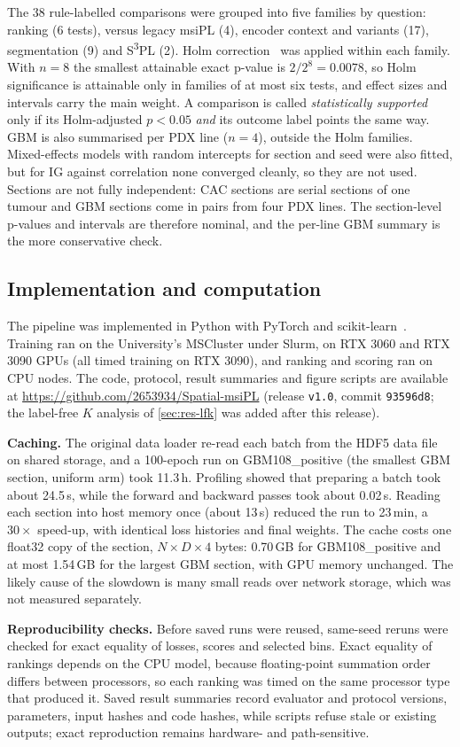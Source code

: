 The 38 rule-labelled comparisons were grouped into five families by question:
ranking (6 tests), versus legacy msiPL (4), encoder context and variants (17),
segmentation (9) and S\textsuperscript{3}PL (2). Holm
correction~\citep{holm1979simple} was applied within each family. With $n=8$
the smallest attainable exact p-value is $2/2^8=0.0078$, so Holm significance
is attainable only in families of at most six tests, and effect sizes and
intervals carry the main weight. A comparison is called \emph{statistically
supported} only if its Holm-adjusted $p<0.05$ \emph{and} its outcome label
points the same way. GBM is also summarised per PDX line ($n=4$), outside the
Holm families. Mixed-effects models with random intercepts for section and
seed were also fitted, but for IG against correlation none converged
cleanly, so they are not used. Sections are not fully independent: CAC
sections are serial sections of one tumour and GBM sections come in pairs from
four PDX lines. The section-level p-values and intervals are therefore
nominal, and the per-line GBM summary is the more conservative check.

\subsection{Implementation and computation}
\label{sec:compute}
The pipeline was implemented in Python with PyTorch and
scikit-learn~\citep{pedregosa2011scikit}. Training ran on the University's
MSCluster under Slurm, on RTX 3060 and RTX 3090 GPUs (all timed training on RTX
3090), and ranking and scoring
ran on CPU nodes. The code, protocol, result summaries and figure scripts are
available at \url{https://github.com/2653934/Spatial-msiPL} (release
\texttt{v1.0}, commit
\texttt{93596d8}; the label-free $K$ analysis of \cref{sec:res-lfk} was added
after this release).

\textbf{Caching.} The original data loader re-read each batch from the HDF5 data file on
shared storage, and a 100-epoch run on GBM108\_positive (the smallest GBM
section, uniform arm) took 11.3\,h. Profiling showed that
preparing a batch took about 24.5\,s, while the forward and backward passes took
about 0.02\,s. Reading each section into host memory once (about 13\,s)
reduced the run to 23\,min, a $30\times$ speed-up, with identical loss
histories and final weights. The cache costs one float32 copy of the section,
$N\times D\times4$ bytes: 0.70\,GB for GBM108\_positive and at most 1.54\,GB for
the largest GBM section, with GPU memory unchanged. The likely cause of the
slowdown is many small reads over network storage, which was not measured
separately.

\textbf{Reproducibility checks.} Before saved runs were reused, same-seed reruns
were checked for exact equality of losses, scores and selected bins. Exact
equality of rankings depends on the CPU model, because floating-point
summation order differs between processors, so each ranking was timed on the
same processor type that produced it. Saved result summaries record evaluator
and protocol versions, parameters, input hashes and code hashes, while scripts
refuse stale or existing outputs; exact reproduction remains hardware- and
path-sensitive.
